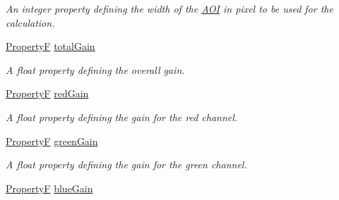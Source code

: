 \begin{DoxyCompactItemize}
\begin{DoxyCompactList}\small\item\em An integer property defining the width of the \hyperlink{struct_a_o_i}{A\+O\+I} in pixel to be used for the calculation. \end{DoxyCompactList}\item 
\hypertarget{classmv_i_m_p_a_c_t_1_1acquire_1_1_white_balance_settings_a04a1d39f26b4ebd3f2c938a5e04c5c54}{\hyperlink{group___common_interface_gaf54865fe5a3d5cfd15f9a111b40d09f9}{Property\+F} \hyperlink{classmv_i_m_p_a_c_t_1_1acquire_1_1_white_balance_settings_a04a1d39f26b4ebd3f2c938a5e04c5c54}{total\+Gain}}\label{classmv_i_m_p_a_c_t_1_1acquire_1_1_white_balance_settings_a04a1d39f26b4ebd3f2c938a5e04c5c54}

\begin{DoxyCompactList}\small\item\em A float property defining the overall gain. \end{DoxyCompactList}\item 
\hypertarget{classmv_i_m_p_a_c_t_1_1acquire_1_1_white_balance_settings_acedbdca2fc983269f2e0506b5a477721}{\hyperlink{group___common_interface_gaf54865fe5a3d5cfd15f9a111b40d09f9}{Property\+F} \hyperlink{classmv_i_m_p_a_c_t_1_1acquire_1_1_white_balance_settings_acedbdca2fc983269f2e0506b5a477721}{red\+Gain}}\label{classmv_i_m_p_a_c_t_1_1acquire_1_1_white_balance_settings_acedbdca2fc983269f2e0506b5a477721}

\begin{DoxyCompactList}\small\item\em A float property defining the gain for the red channel. \end{DoxyCompactList}\item 
\hypertarget{classmv_i_m_p_a_c_t_1_1acquire_1_1_white_balance_settings_a7dee0778b113af0488c98512527d6d61}{\hyperlink{group___common_interface_gaf54865fe5a3d5cfd15f9a111b40d09f9}{Property\+F} \hyperlink{classmv_i_m_p_a_c_t_1_1acquire_1_1_white_balance_settings_a7dee0778b113af0488c98512527d6d61}{green\+Gain}}\label{classmv_i_m_p_a_c_t_1_1acquire_1_1_white_balance_settings_a7dee0778b113af0488c98512527d6d61}

\begin{DoxyCompactList}\small\item\em A float property defining the gain for the green channel. \end{DoxyCompactList}\item 
\hypertarget{classmv_i_m_p_a_c_t_1_1acquire_1_1_white_balance_settings_af53ede73790c0cd0ca7b82d561b85e1a}{\hyperlink{group___common_interface_gaf54865fe5a3d5cfd15f9a111b40d09f9}{Property\+F} \hyperlink{classmv_i_m_p_a_c_t_1_1acquire_1_1_white_balance_settings_af53ede73790c0cd0ca7b82d561b85e1a}{blue\+Gain}}\label{classmv_i_m_p_a_c_t_1_1acquire_1_1_white_balance_settings_af53ede73790c0cd0ca7b82d561b85e1a}


\end{DoxyCompactItemize}

